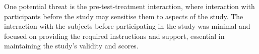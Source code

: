 One potential threat is the pre-test-treatment interaction, where interaction
with participants before the study may sensitise them to aspects of the study.
The interaction with the subjects before participating in the study was minimal
and focused on providing the required instructions and support, essential in
maintaining the study's validity and scores.
